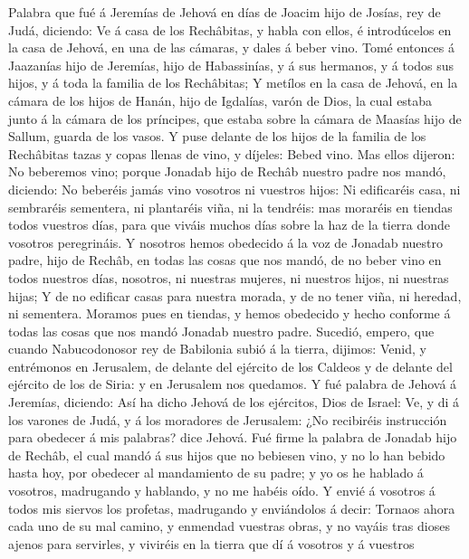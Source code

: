  Palabra que fué á Jeremías de Jehová en días de Joacim hijo
de Josías, rey de Judá, diciendo:  Ve á casa de los
Rechâbitas, y habla con ellos, é introdúcelos en la casa de Jehová, en
una de las cámaras, y dales á beber vino.  Tomé entonces á
Jaazanías hijo de Jeremías, hijo de Habassinías, y á sus hermanos, y á
todos sus hijos, y á toda la familia de los Rechâbitas;  Y
metílos en la casa de Jehová, en la cámara de los hijos de Hanán, hijo
de Igdalías, varón de Dios, la cual estaba junto á la cámara de los
príncipes, que estaba sobre la cámara de Maasías hijo de Sallum, guarda
de los vasos.  Y puse delante de los hijos de la familia de
los Rechâbitas tazas y copas llenas de vino, y díjeles: Bebed vino.
 Mas ellos dijeron: No beberemos vino; porque Jonadab hijo
de Rechâb nuestro padre nos mandó, diciendo: No beberéis jamás vino
vosotros ni vuestros hijos:  Ni edificaréis casa, ni
sembraréis sementera, ni plantaréis viña, ni la tendréis: mas moraréis
en tiendas todos vuestros días, para que viváis muchos días sobre la haz
de la tierra donde vosotros peregrináis.  Y nosotros hemos
obedecido á la voz de Jonadab nuestro padre, hijo de Rechâb, en todas
las cosas que nos mandó, de no beber vino en todos nuestros días,
nosotros, ni nuestras mujeres, ni nuestros hijos, ni nuestras hijas;
 Y de no edificar casas para nuestra morada, y de no tener
viña, ni heredad, ni sementera.  Moramos pues en tiendas, y
hemos obedecido y hecho conforme á todas las cosas que nos mandó Jonadab
nuestro padre.  Sucedió, empero, que cuando Nabucodonosor
rey de Babilonia subió á la tierra, dijimos: Venid, y entrémonos en
Jerusalem, de delante del ejército de los Caldeos y de delante del
ejército de los de Siria: y en Jerusalem nos quedamos.  Y
fué palabra de Jehová á Jeremías, diciendo:  Así ha dicho
Jehová de los ejércitos, Dios de Israel: Ve, y di á los varones de Judá,
y á los moradores de Jerusalem: ¿No recibiréis instrucción para obedecer
á mis palabras? dice Jehová.  Fué firme la palabra de
Jonadab hijo de Rechâb, el cual mandó á sus hijos que no bebiesen vino,
y no lo han bebido hasta hoy, por obedecer al mandamiento de su padre; y
yo os he hablado á vosotros, madrugando y hablando, y no me habéis oído.
 Y envié á vosotros á todos mis siervos los profetas,
madrugando y enviándolos á decir: Tornaos ahora cada uno de su mal
camino, y enmendad vuestras obras, y no vayáis tras dioses ajenos para
servirles, y viviréis en la tierra que dí á vosotros y á vuestros
